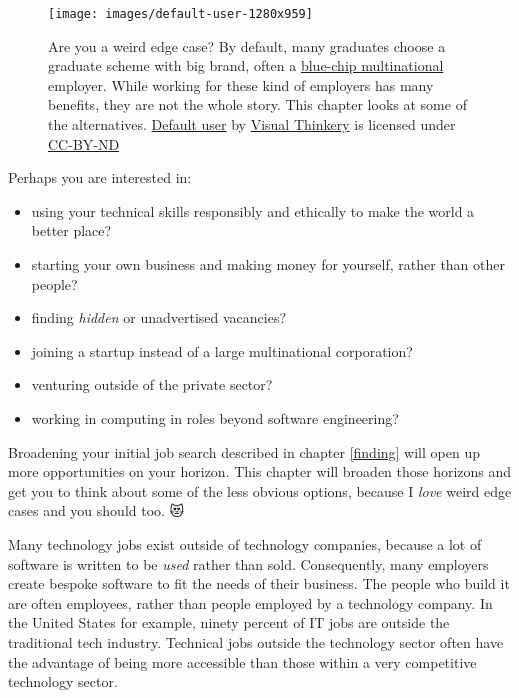 \documentclass[
]{book}
\providecommand{\tightlist}{%
  \setlength{\itemsep}{0pt}\setlength{\parskip}{0pt}}
\begin{document}
\begin{figure}

{\centering \texttt{[image: images/default-user-1280x959]} 

}

\caption{Are you a weird edge case? By default, many graduates choose a graduate scheme with big brand, often a \href{https://en.wikipedia.org/wiki/Blue_chip_(stock_market)}{blue-chip multinational} employer. While working for these kind of employers has many benefits, they are not the whole story. This chapter looks at some of the alternatives. \href{https://bryanmmathers.com/default-user/}{Default user} by \href{https://visualthinkery.com}{Visual Thinkery} is licensed under \href{https://creativecommons.org/licenses/by-nd/4.0/}{CC-BY-ND}}\label{fig:default-user-fig}
\end{figure}



Perhaps you are interested in:

\begin{itemize}
\tightlist
\item
  using your technical skills responsibly and ethically to make the world a better place?
\item
  starting your own business and making money for yourself, rather than other people?
\item
  finding \emph{hidden} or unadvertised vacancies?
\item
  joining a startup instead of a large multinational corporation?
\item
  venturing outside of the private sector?
\item
  working in computing in roles beyond software engineering?
\end{itemize}

Broadening your initial job search described in chapter \ref{finding} will open up more opportunities on your horizon. This chapter will broaden those horizons and get you to think about some of the less obvious options, because I \emph{love} weird edge cases and you should too. 😻

Many technology jobs exist outside of technology companies, \citep{outsideit} because a lot of software is written to be \emph{used} rather than sold. Consequently, many employers create bespoke software to fit the needs of their business. The people who build it are often employees, rather than people employed by a technology company. In the United States for example, ninety percent of IT jobs are outside the traditional tech industry. Technical jobs outside the technology sector often have the advantage of being more accessible than those within a very competitive technology sector. \citep{burninglass}
\end{document}
